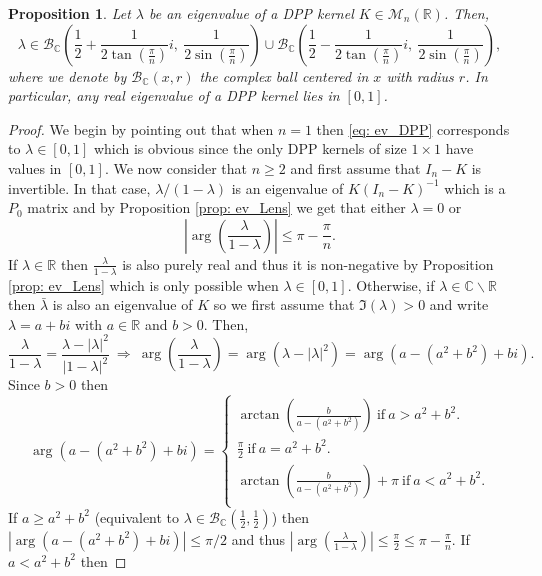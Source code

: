 \documentclass{article}
\numberwithin{equation}{section}
\renewcommand{\leq}{\leqslant}
\renewcommand{\geq}{\geqslant}
\newcommand{\bC}{\mathbb{C}}
\newcommand{\bR}{\mathbb{R}}
\theoremstyle{plain}
\newtheorem{proposition}{Proposition}[section]
\begin{document}
\begin{proposition} \label{prop: ev_DPP}
Let $\lambda$ be an eigenvalue of a DPP kernel $K\in\mathcal{M}_n(\bR)$. Then,
\begin{equation}\label{eq: ev_DPP}
\lambda\in \mathcal{B}_\mathbb{C}\left(\frac{1}{2}+\frac{1}{2\tan\left(\frac \pi n\right)}i,~\frac{1}{2\sin(\frac \pi n)}\right)\cup \mathcal{B}_\mathbb{C}\left(\frac{1}{2}-\frac{1}{2\tan\left(\frac \pi n\right)}i,~\frac{1}{2\sin(\frac \pi n)}\right),
\end{equation}
where we denote by $\mathcal{B}_\mathbb{C}(x,r)$ the complex ball centered in $x$ with radius $r$. In particular, any real eigenvalue of a DPP kernel lies in $[0, 1]$.
\end{proposition}
\begin{proof}
We begin by pointing out that when $n=1$ then \eqref{eq: ev_DPP} corresponds to $\lambda\in [0, 1]$ which is obvious since the only DPP kernels of size $1\times 1$ have values in $[0, 1]$. We now consider that $n\geq 2$ and first assume that $I_n-K$ is invertible. In that case, $\lambda/(1-\lambda)$ is an eigenvalue of $K(I_n-K)^{-1}$ which is a $P_0$ matrix and by Proposition \ref{prop: ev_Lens} we get that either $\lambda=0$ or
\begin{equation}\label{eq: cond_eig_K}
\left|\arg\left(\frac{\lambda}{1-\lambda}\right)\right|\leq\pi - \frac{\pi}{n}.
\end{equation}
If $\lambda\in\bR$ then $\frac{\lambda}{1-\lambda}$ is also purely real and thus it is non-negative by Proposition \ref{prop: ev_Lens} which is only possible when $\lambda\in [0, 1]$. Otherwise, if $\lambda\in\bC\backslash\bR$ then $\bar\lambda$ is also an eigenvalue of $K$ so we first assume that $\Im(\lambda)>0$ and write $\lambda=a+bi$ with $a\in\bR$ and $b>0$. Then,
\[\frac{\lambda}{1-\lambda}=\frac{\lambda-|\lambda|^2}{|1-\lambda|^2}~\Rightarrow~\arg\left(\frac{\lambda}{1-\lambda}\right)=\arg(\lambda-|\lambda|^2)=\arg(a-(a^2+b^2)+bi).\]
Since $b>0$ then
\[\arg(a-(a^2+b^2)+bi)=\left\{\begin{array}{l}
\arctan\left(\frac{b}{a-(a^2+b^2)}\right)~\mbox{if}~a>a^2+b^2.\\
\frac{\pi}{2}~\mbox{if}~a=a^2+b^2.\\
\arctan\left(\frac{b}{a-(a^2+b^2)}\right)+\pi~\mbox{if}~a<a^2+b^2.\\
\end{array}
\right.\]
If $a\geq a^2+b^2$ (equivalent to $\lambda\in \mathcal{B}_\mathbb{C}\left(\frac 1 2, \frac 1 2\right)$) then $|\arg(a-(a^2+b^2)+bi)|\leq \pi/2$ and thus $\left|\arg\left(\frac{\lambda}{1-\lambda}\right)\right|\leq\frac{\pi}{2}\leq \pi - \frac{\pi}{n}$. If $a< a^2+b^2$ then 

\end{proof}
\end{document}
